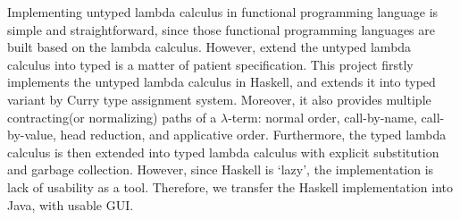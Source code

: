 Implementing untyped lambda calculus in functional programming language is simple and straightforward, since those functional programming languages are built based on the lambda calculus. However, extend the untyped lambda calculus into typed is a matter of patient specification. This project firstly implements the untyped lambda calculus in Haskell, and extends it into typed variant by Curry type assignment system. Moreover, it also provides multiple contracting(or normalizing) paths of a $\lambda$-term: normal order, call-by-name, call-by-value, head reduction, and applicative order. Furthermore, the typed lambda calculus is then extended into typed lambda calculus with explicit substitution and garbage collection. However, since Haskell is `lazy', the implementation is lack of usability as a tool. Therefore, we transfer the Haskell implementation into Java, with usable GUI.         








